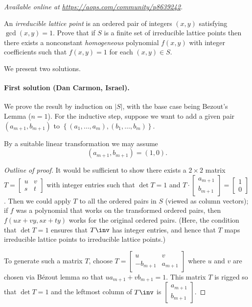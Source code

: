 
\textsl{Available online at \url{https://aops.com/community/p8639242}.}
\begin{mdframed}[style=mdpurplebox,frametitle={Problem statement}]
An \emph{irreducible lattice point} is an ordered pair
of integers $(x,y)$ satisfying $\gcd(x,y) = 1$.
Prove that if $S$ is a finite set of irreducible lattice points
then there exists a nonconstant
\emph{homogeneous} polynomial $f(x,y)$ with integer coefficients
such that $f(x,y)=1$ for each $(x,y) \in S$.
\end{mdframed}
We present two solutions.

\paragraph{First solution (Dan Carmon, Israel).}
We prove the result by induction on $|S|$,
with the base case being Bezout's Lemma ($n=1$).
For the inductive step, suppose we want to add a given pair
$(a_{m+1},b_{m+1})$ to $\left\{ (a_1, \dots, a_m), (b_1, \dots, b_m) \right\}$.
\begin{claim*}
  [Standard]
  By a suitable linear transformation we may assume
  \[ (a_{m+1},b_{m+1}) = (1,0). \]
\end{claim*}
\begin{proof}
  [Outline of proof]
  It would be sufficient to show there exists a $2 \times 2$ matrix
  $T = \left[ \begin{smallmatrix} u & v \\ s & t \end{smallmatrix} \right]$
  with integer entries such that $\det T = 1$ and
  $T \cdot \left[ \begin{smallmatrix} a_{m+1} \\ b_{m+1} \end{smallmatrix} \right]
  = \left[ \begin{smallmatrix} 1 \\ 0 \end{smallmatrix} \right]$.
  Then we could apply $T$ to all the ordered pairs in $S$ (viewed as column vectors);
  if $f$ was a polynomial that works on the transformed ordered pairs,
  then $f(ux+vy, sx+ty)$ works for the original ordered pairs.
  (Here, the condition that $\det T = 1$ ensures that $T\inv$ has integer entries,
  and hence that $T$ maps irreducible lattice points to irreducible lattice points.)

  To generate such a matrix $T$, choose
  $T = \left[ \begin{smallmatrix} u & v  \\ -b_{m+1} & a_{m+1} \end{smallmatrix} \right]$
  where $u$ and $v$ are chosen via B\'{e}zout lemma so that $ua_{m+1} + vb_{m+1} = 1$.
  This matrix $T$ is rigged so that $\det T = 1$ and the leftmost column of $T\inv$ is
  $\left[ \begin{smallmatrix} a_{m+1} \\ b_{m+1} \end{smallmatrix} \right]$.
\end{proof}
